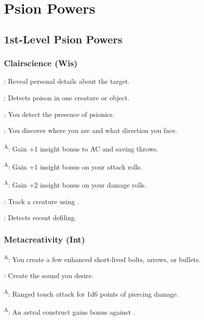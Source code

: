 \section{Psion Powers}



\subsection{1st-Level Psion Powers}


\subsubsection{Clairscience (Wis)}

: Reveal personal details about the target.

: Detects poison in one creature or object.

: You detect the presence of psionics.

: You discover where you are and what direction you face.

\textsuperscript{A}: Gain +1 insight bonus to AC and saving throws.

\textsuperscript{A}: Gain +1 insight bonus on your attack rolls.

\textsuperscript{A}: Gain +2 insight bonus on your damage rolls.

: Track a creature using .

: Detects recent defiling.


\subsubsection{Metacreativity (Int)}

\textsuperscript{A}: You create a few enhanced short-lived bolts, arrows, or bullets.

: Create the sound you desire.

\textsuperscript{A}: Ranged touch attack for 1d6 points of piercing damage.

\textsuperscript{A}: An astral construct gains bonus against .

